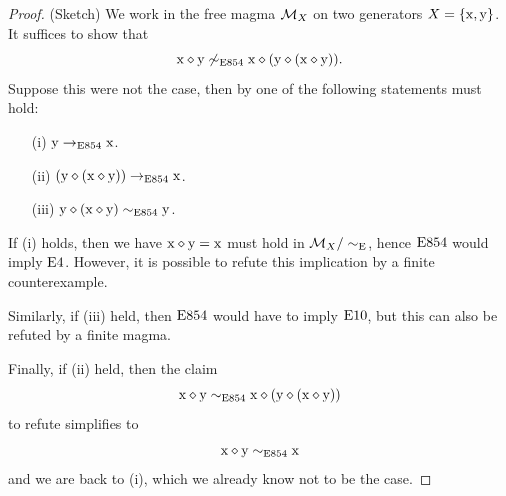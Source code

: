 \begin{proof}(Sketch)
  We work in the free magma ${\mathcal{M}}_X$ on two generators $X = \{\mathrm{x},\mathrm{y}\}$.  It suffices to show that
$$  \mathrm{x} \diamond \mathrm{y} \not \sim_{\mathrm{E}854} \mathrm{x} \diamond (\mathrm{y} \diamond (\mathrm{x} \diamond \mathrm{y})).$$
Suppose this were not the case, then by  one of the following statements must hold:
\begin{itemize}
\item[(i)] $\mathrm{y} \to_{\mathrm{E}854} \mathrm{x}$.
\item[(ii)] $(\mathrm{y} \diamond (\mathrm{x} \diamond \mathrm{y})) \to_{\mathrm{E}854} \mathrm{x}$.
\item[(iii)] $\mathrm{y} \diamond (\mathrm{x} \diamond \mathrm{y}) \sim_{\mathrm{E}854} \mathrm{y}$.
\end{itemize}
If (i) holds, then we have $\mathrm{x} \diamond \mathrm{y} = \mathrm{x}$ must hold in ${\mathcal{M}}_X/\sim_{\mathrm{E}}$, hence $\mathrm{E}854$ would imply $\mathrm{E}4$.  However, it is possible to refute this implication by a finite counterexample.

Similarly, if (iii) held, then $\mathrm{E}854$ would have to imply $\mathrm{E}10$, but this can also be refuted by a finite magma.

Finally, if (ii) held, then the claim
$$  \mathrm{x} \diamond \mathrm{y} \sim_{\mathrm{E}854} \mathrm{x} \diamond (\mathrm{y} \diamond (\mathrm{x} \diamond \mathrm{y}))$$
to refute simplifies to
$$  \mathrm{x} \diamond \mathrm{y} \sim_{\mathrm{E}854} \mathrm{x}$$
and we are back to (i), which we already know not to be the case.
\end{proof}
